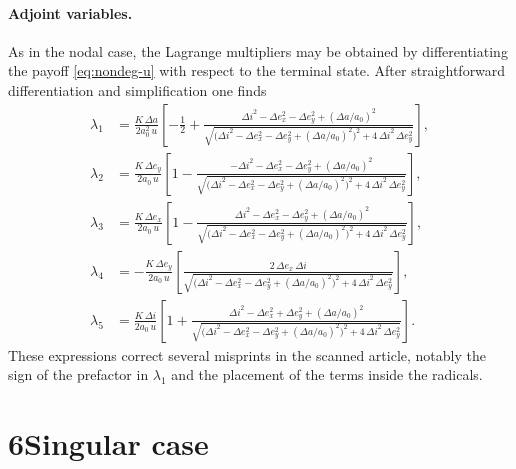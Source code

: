 \documentclass[12pt]{article}
\begin{document}
\paragraph{Adjoint variables.}  As in the nodal case, the Lagrange
multipliers may be obtained by differentiating the payoff
\eqref{eq:nondeg-u} with respect to the terminal state.  After
straightforward differentiation and simplification one finds
\begin{align}
  \lambda_1 &= \frac{K\,\Delta a}{2a_0^2\,u}
    \left[-\frac{1}{2}
    + \frac{\Delta i^2 - \Delta e_x^2 - \Delta e_y^2 + (\Delta a/a_0)^2}{
      \sqrt{\bigl(\Delta i^2 - \Delta e_x^2 - \Delta e_y^2 + (\Delta a/a_0)^2\bigr)^2
      + 4\,\Delta i^2\,\Delta e_y^2}}
    \right],
    \tag{B17}\label{eq:nondeg-l1}\\
  \lambda_2 &= \frac{K\,\Delta e_y}{2a_0\,u}
    \left[1
    - \frac{-\Delta i^2 - \Delta e_x^2 - \Delta e_y^2 + (\Delta a/a_0)^2}{
      \sqrt{\bigl(\Delta i^2 - \Delta e_x^2 - \Delta e_y^2 + (\Delta a/a_0)^2\bigr)^2
      + 4\,\Delta i^2\,\Delta e_y^2}}
    \right],
    \tag{B18}\label{eq:nondeg-l2}\\
  \lambda_3 &= \frac{K\,\Delta e_x}{2a_0\,u}
    \left[1
    - \frac{\Delta i^2 - \Delta e_x^2 - \Delta e_y^2 + (\Delta a/a_0)^2}{
      \sqrt{\bigl(\Delta i^2 - \Delta e_x^2 - \Delta e_y^2 + (\Delta a/a_0)^2\bigr)^2
      + 4\,\Delta i^2\,\Delta e_y^2}}
    \right],
    \tag{B19}\label{eq:nondeg-l3}\\
  \lambda_4 &= -\frac{K\,\Delta e_y}{2a_0\,u}
    \left[\frac{2\,\Delta e_x\,\Delta i}{
      \sqrt{\bigl(\Delta i^2 - \Delta e_x^2 - \Delta e_y^2 + (\Delta a/a_0)^2\bigr)^2
      + 4\,\Delta i^2\,\Delta e_y^2}}
    \right],
    \tag{B20}\label{eq:nondeg-l4}\\
  \lambda_5 &= \frac{K\,\Delta i}{2a_0\,u}
    \left[1
    + \frac{\Delta i^2 - \Delta e_x^2 + \Delta e_y^2 + (\Delta a/a_0)^2}{
      \sqrt{\bigl(\Delta i^2 - \Delta e_x^2 - \Delta e_y^2 + (\Delta a/a_0)^2\bigr)^2
      + 4\,\Delta i^2\,\Delta e_y^2}}
    \right].
    \tag{B21}\label{eq:nondeg-l5}
\end{align}
These expressions correct several misprints in the scanned article,
notably the sign of the prefactor in $\lambda_1$ and the placement of
the terms inside the radicals.

\section*{6\quad Singular case}
\label{sec:singular-case}
\end{document}
